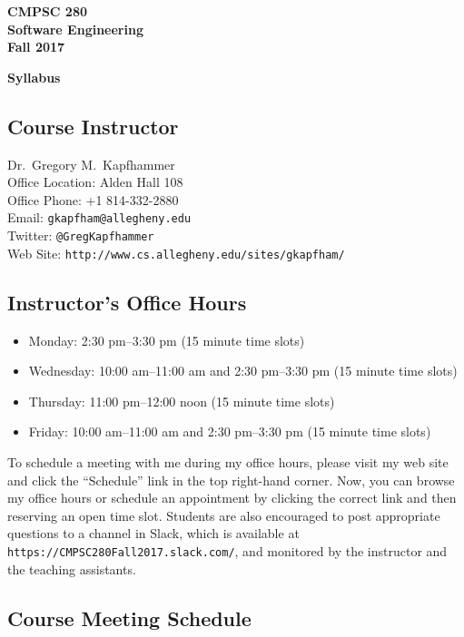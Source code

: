 \documentclass[11pt]{article}
\newcommand{\url}[1]{\lstinline{#1}}
\newcommand{\syllabustitle}[1]
{
  \begin{center}
    \begin{center}
      \bf
      CMPSC 280\\Software Engineering\\
      Fall 2017\\
      \medskip
    \end{center}
    \bf
    #1
  \end{center}
}
\begin{document}
\thispagestyle{empty}

\syllabustitle{Syllabus}

\subsection*{Course Instructor}
Dr.\ Gregory M.\ Kapfhammer\\
\noindent Office Location: Alden Hall 108 \\
\noindent Office Phone: +1 814-332-2880 \\
\noindent Email: \url{gkapfham@allegheny.edu} \\
\noindent Twitter: \url{@GregKapfhammer} \\
\noindent Web Site: \url{http://www.cs.allegheny.edu/sites/gkapfham/}

\subsection*{Instructor's Office Hours}

\begin{itemize}
  \itemsep0em

  \item Monday: 2:30 pm--3:30 pm (15 minute time slots)

  \item Wednesday: 10:00 am--11:00 am and 2:30 pm--3:30 pm (15 minute time slots)

  \item Thursday: 11:00 pm--12:00 noon (15 minute time slots)

  \item Friday: 10:00 am--11:00 am and 2:30 pm--3:30 pm (15 minute time slots)

\end{itemize}

\noindent To schedule a meeting with me during my office hours, please visit my web site and click the ``Schedule'' link
in the top right-hand corner. Now, you can browse my office hours or schedule an appointment by clicking the correct
link and then reserving an open time slot. Students are also encouraged to post appropriate questions to a channel in
Slack, which is available at \url{https://CMPSC280Fall2017.slack.com/}, and monitored by the instructor and the
teaching assistants.

\subsection*{Course Meeting Schedule}
\end{document}
